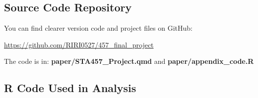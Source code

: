 \documentclass[
  letterpaper,
  DIV=11,
  numbers=noendperiod]{scrartcl}
\begin{document}
\hypertarget{source-code-repository}{%
\subsection{Source Code Repository}\label{source-code-repository}}

You can find clearer version code and project files on GitHub:

\url{https://github.com/RIRI0527/457_final_project}

The code is in: \textbf{paper/STA457\_Project.qmd} and
\textbf{paper/appendix\_code.R}

\hypertarget{r-code-used-in-analysis}{%
\subsection{R Code Used in Analysis}\label{r-code-used-in-analysis}}
\end{document}
